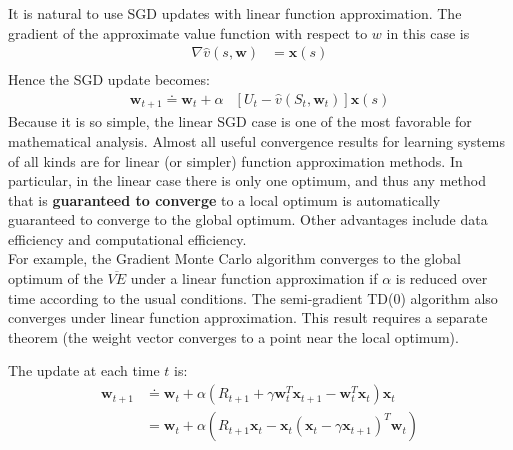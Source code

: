 It is natural to use SGD updates with linear function approximation. The gradient of the approximate value function with respect to $w$ in this case is
\begin{align}
    \nabla\hat{v}(s,\mathbf{w})&=\mathbf{x}(s)\\
\end{align}
Hence the SGD update becomes:
\begin{align}
    \mathbf{w}_{t+1}\doteq\mathbf{w}_{t}+\alpha&[U_t-\hat{v}(S_t, \mathbf{w}_{t})]\mathbf{x}(s)
\end{align}
Because it is so simple, the linear SGD case is one of the most favorable for mathematical analysis. Almost all useful convergence results for learning systems of all kinds are for linear (or simpler) function approximation methods.
In particular, in the linear case there is only one optimum, and thus any method that is \textbf{guaranteed to converge} to a local optimum is automatically guaranteed to converge to the global optimum. Other advantages include data efficiency and computational efficiency.\\

For example, the Gradient Monte Carlo algorithm converges to the global optimum of the $\overline{VE}$ under a linear function approximation if $\alpha$ is reduced over time according to the usual conditions. The semi-gradient TD(0) algorithm also converges under linear function approximation. This result requires a separate theorem (the weight vector converges to a point near the local optimum).

The update at each time $t$ is:
\begin{align}
    \mathbf{w}_{t+1}&\doteq\mathbf{w}_t+\alpha\left(R_{t+1}+\gamma\mathbf{w}_t^T\mathbf{x}_{t+1}-\mathbf{w}_t^T\mathbf{x}_t\right)\mathbf{x}_t\\
    &=\mathbf{w}_t+\alpha\left(R_{t+1}\mathbf{x}_t-\mathbf{x}_t(\mathbf{x}_t-\gamma\mathbf{x}_{t+1})^T\mathbf{w}_t\right)
\end{align}

